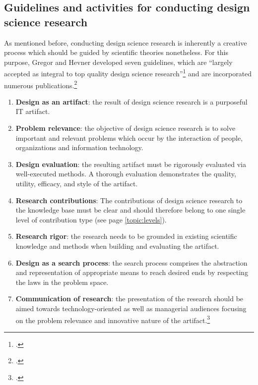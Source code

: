 \subsection{Guidelines and activities for conducting design science research} \label{subsec:GuidelinesDesignScience}
As mentioned before, conducting design science research is inherently a creative process which should be guided by scientific theories nonetheless. For this purpose, Gregor and Hevner developed seven guidelines, which are \enquote{largely accepted as integral to top quality design science research}\footcite[p.19]{HevnerDesignResearchInformation2010} and are incorporated numerous publications.\footcites[Cf.][p.20 et seqq]{PfeffersDesignScienceResearch2007}
\begin{enumerate}
    \item \textbf{Design as an artifact}: the result of design science research is a purposeful IT artifact.
    \item \textbf{Problem relevance}: the objective of design science research is to solve important and relevant problems which occur by the interaction of people, organizations and information technology.
    \item \textbf{Design evaluation}: the resulting artifact must be rigorously evaluated via well-executed methods. A thorough evaluation demonstrates the quality, utility, efficacy, and style of the artifact.
    \item \textbf{Research contributions}: The contributions of design science research to the knowledge base must be clear and should therefore belong to one single level of contribution type (see page \ref{topic:levels}).
    \item \textbf{Research rigor}: the research needs to be grounded in existing scientific knowledge and methods when building and evaluating the artifact.
    \item \textbf{Design as a search process}: the search process comprises the abstraction and representation of appropriate means to reach desired ends by respecting the laws in the problem space.
    \item \textbf{Communication of research}: the presentation of the research should be aimed towards technology-oriented as well as managerial audiences focusing on the problem relevance and innovative nature of the artifact.\footcites[Cf.][p.iv]{ZmudEditorComments1997}[cf.][pp.82 et seq]{HevnerDesignScienceResearch2004}[cf.][p.viii]{WeberEditorCommentsStill2003}
\end{enumerate}

